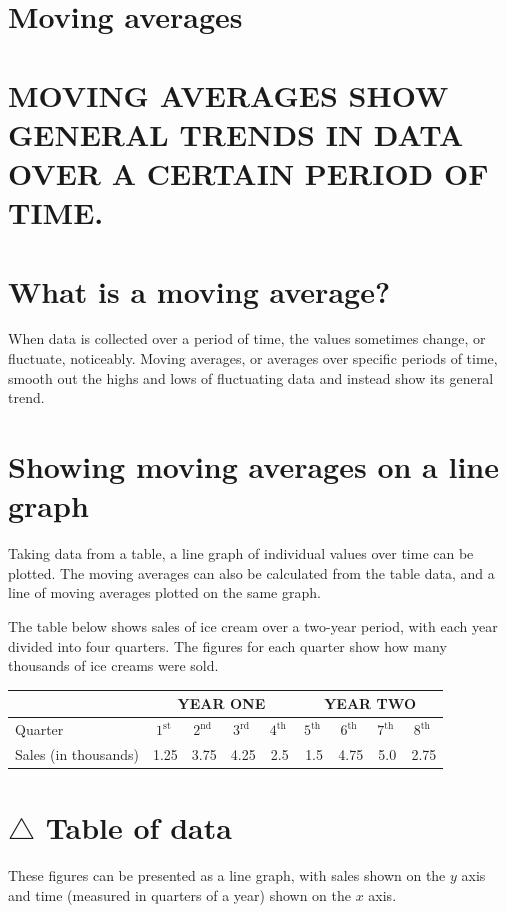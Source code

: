 \documentclass[10pt]{article}
\begin{document}
\section*{Moving averages}
\section*{MOVING AVERAGES SHOW GENERAL TRENDS IN DATA OVER A CERTAIN PERIOD OF TIME.}
\section*{What is a moving average?}
When data is collected over a period of time, the values sometimes change, or fluctuate, noticeably. Moving averages, or averages over specific periods of time, smooth out the highs and lows of fluctuating data and instead show its general trend.

\section*{Showing moving averages on a line graph}
Taking data from a table, a line graph of individual values over time can be plotted. The moving averages can also be calculated from the table data, and a line of moving averages plotted on the same graph.

The table below shows sales of ice cream over a two-year period, with each year divided into four quarters. The figures for each quarter show how many thousands of ice creams were sold.

\begin{center}
\begin{tabular}{|l|c|c|c|c|c|c|c|c|}
\hline
\multicolumn{1}{c|}{} & \multicolumn{4}{c|}{YEAR ONE} & \multicolumn{4}{c|}{YEAR TWO} \\
\hline
Quarter & $1^{\text {st }}$ & $2^{\text {nd }}$ & $3^{\text {rd }}$ & $4^{\text {th }}$ & $5^{\text {th }}$ & $6^{\text {th }}$ & $7^{\text {th }}$ & $8^{\text {th }}$ \\
\hline
Sales (in thousands) & 1.25 & 3.75 & 4.25 & 2.5 & 1.5 & 4.75 & 5.0 & 2.75 \\
\hline
\end{tabular}
\end{center}

\section*{$\triangle$ Table of data}
These figures can be presented as a line graph, with sales shown on the $y$ axis and time (measured in quarters of a year) shown on the $x$ axis.
\end{document}

